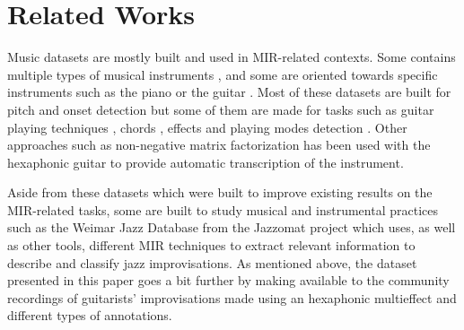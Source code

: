 \documentclass{article}
\begin{document}

\section{Related Works}\label{sec:related_works}


Music datasets are mostly built and used in MIR-related contexts.  Some contains multiple types of musical instruments \cite{thickstun2017learning}, and some are oriented towards specific instruments such as the piano \cite{Emiya2010MAPS, hawthorne2018} or the guitar \cite{Kehling2014, sci:Xi2018}. Most of these datasets are built for pitch and onset detection but some of them are made for tasks such as guitar playing techniques \cite{sci:Su2014a}, chords \cite{nadar2019Chords}, effects \cite{Stein2010} and playing modes detection \cite{Foulon2014}.  Other approaches such as non-negative matrix factorization has been used with the hexaphonic guitar \cite{sci:OGrady2009} to provide automatic transcription of the instrument.

Aside from these datasets which were built to improve existing results on the MIR-related tasks, some are built to study musical and instrumental practices such as the Weimar Jazz Database from the Jazzomat project \cite{Pfleiderer:2017:BOOK} which uses, as well as other tools, different MIR techniques to extract relevant information to describe and classify jazz improvisations. As mentioned above, the dataset presented in this paper goes a bit further by making available to the community recordings of guitarists' improvisations made using an hexaphonic multieffect and different types of annotations.
\end{document}

